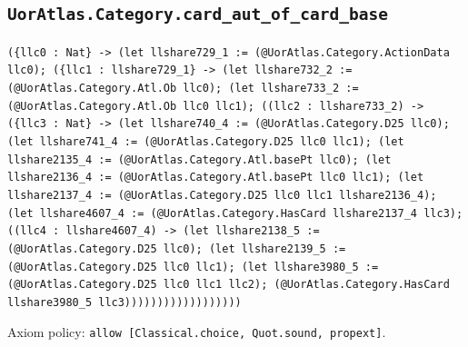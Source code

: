 \documentclass[11pt]{article}
\begin{document}
\subsection*{\texttt{UorAtlas.Category.card\_aut\_of\_card\_base}}
\noindent\texttt{(\{llc0 : Nat\} -> (let llshare729\_1 := (@UorAtlas.Category.ActionData llc0); (\{llc1 : llshare729\_1\} -> (let llshare732\_2 := (@UorAtlas.Category.Atl.Ob llc0); (let llshare733\_2 := (@UorAtlas.Category.Atl.Ob llc0 llc1); ((llc2 : llshare733\_2) -> (\{llc3 : Nat\} -> (let llshare740\_4 := (@UorAtlas.Category.D25 llc0); (let llshare741\_4 := (@UorAtlas.Category.D25 llc0 llc1); (let llshare2135\_4 := (@UorAtlas.Category.Atl.basePt llc0); (let llshare2136\_4 := (@UorAtlas.Category.Atl.basePt llc0 llc1); (let llshare2137\_4 := (@UorAtlas.Category.D25 llc0 llc1 llshare2136\_4); (let llshare4607\_4 := (@UorAtlas.Category.HasCard llshare2137\_4 llc3); ((llc4 : llshare4607\_4) -> (let llshare2138\_5 := (@UorAtlas.Category.D25 llc0); (let llshare2139\_5 := (@UorAtlas.Category.D25 llc0 llc1); (let llshare3980\_5 := (@UorAtlas.Category.D25 llc0 llc1 llc2); (@UorAtlas.Category.HasCard llshare3980\_5 llc3))))))))))))))))))}\par
\noindent Axiom policy: \texttt{allow [Classical.choice, Quot.sound, propext]}.\par
\end{document}
